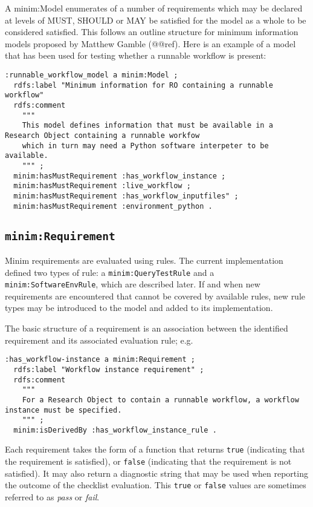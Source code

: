 \documentclass[]{article}
\begin{document}
A minim:Model enumerates of a number of requirements which may be
declared at levels of MUST, SHOULD or MAY be satisfied for the model as
a whole to be considered satisfied. This follows an outline structure
for minimum information models proposed by Matthew Gamble (@@ref). Here
is an example of a model that has been used for testing whether a
runnable workflow is present:

\begin{verbatim}
:runnable_workflow_model a minim:Model ;
  rdfs:label "Minimum information for RO containing a runnable workflow"
  rdfs:comment
    """
    This model defines information that must be available in a Research Object containing a runnable workfow
    which in turn may need a Python software interpeter to be available.
    """ ;
  minim:hasMustRequirement :has_workflow_instance ;
  minim:hasMustRequirement :live_workflow ;
  minim:hasMustRequirement :has_workflow_inputfiles" ;
  minim:hasMustRequirement :environment_python .
\end{verbatim}

\subsection{\texttt{minim:Requirement}}

Minim requirements are evaluated using rules. The current implementation
defined two types of rule: a \texttt{minim:QueryTestRule} and a
\texttt{minim:SoftwareEnvRule}, which are described later. If and when
new requirements are encountered that cannot be covered by available
rules, new rule types may be introduced to the model and added to its
implementation.

The basic structure of a requirement is an association between the
identified requirement and its associated evaluation rule; e.g.

\begin{verbatim}
:has_workflow-instance a minim:Requirement ;
  rdfs:label "Workflow instance requirement" ;
  rdfs:comment
    """
    For a Research Object to contain a runnable workflow, a workflow instance must be specified.
    """ ;
  minim:isDerivedBy :has_workflow_instance_rule .
\end{verbatim}

Each requirement takes the form of a function that returns \texttt{true}
(indicating that the requirement is satisfied), or \texttt{false}
(indicating that the requirement is not satisfied). It may also return a
diagnostic string that may be used when reporting the outcome of the
checklist evaluation. This \texttt{true} or \texttt{false} values are
sometimes referred to as \emph{pass} or \emph{fail}.
\end{document}
